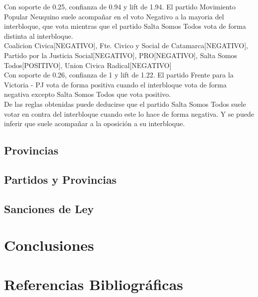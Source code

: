 \documentclass{endm}
\begin{document}
Con soporte de 0.25, confianza de 0.94 y lift de 1.94. El partido Movimiento Popular Neuquino suele acompañar en el voto Negativo a la mayoria del interbloque, que vota mientras que el partido Salta Somos Todos vota de forma distinta al interbloque. \\

{Coalicion Civica[NEGATIVO],
Fte. Civico y Social de Catamarca[NEGATIVO],    
Partido por la Justicia Social[NEGATIVO],       
PRO[NEGATIVO], 
Salta Somos Todos[POSITIVO],                     
Union Civica Radical[NEGATIVO]}               \\

Con soporte de 0.26, confianza de 1 y lift de 1.22. El partido Frente para la Victoria - PJ vota de forma positiva cuando el interbloque vota de forma negativa excepto Salta Somos Todos que vota positivo.\\

De las reglas obtenidas puede deducirse que el partido Salta Somos Todos suele votar en contra del interbloque cuando este lo hace de forma negativa. Y se puede inferir que suele acompañar a la oposición a su interbloque. \\

\subsection{Provincias}

\subsection{Partidos y Provincias}
\subsection{Sanciones de Ley}

\section{Conclusiones}

\section{Referencias Bibliográficas}
\end{document}
